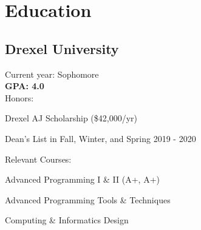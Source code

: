 \documentclass[]{deedy-resume-openfont}
\begin{document}
%
%
\lastupdated

%
%

%
%

\begin{minipage}[t]{0.33\textwidth}


    \section{Education}
    \subsection{Drexel University}
    Current year: Sophomore \\
    \textbf{GPA: 4.0} \\
    \vspace{\topsep}
    Honors:
    \vspace{\topsep} %
    \begin{tightemize}
        \item Drexel AJ Scholarship (\$42,000/yr)
        \item Dean's List in Fall, Winter, and Spring 2019 - 2020
    \end{tightemize}
    Relevant Courses: \\
    \begin{tightemize}
        \item Advanced Programming I \& II (A+, A+)
        \item Advanced Programming Tools \& Techniques
        \item Computing \& Informatics Design
    \end{tightemize}
    \sectionsep


\end{minipage}
\end{document}
